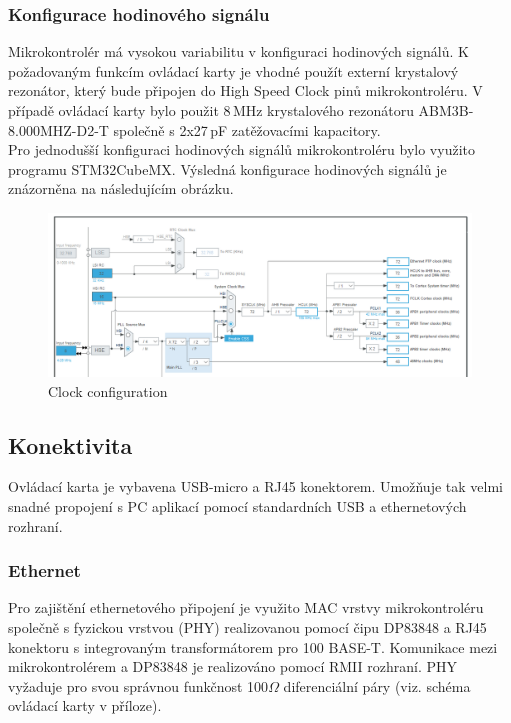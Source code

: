     \subsubsection{Konfigurace hodinového signálu}
    
    Mikrokontrolér má vysokou variabilitu v konfiguraci hodinových signálů.
    K požadovaným funkcím ovládací karty je vhodné použít externí krystalový rezonátor, který bude
    připojen do High Speed Clock pinů mikrokontroléru. V případě ovládací karty bylo použit 8\,MHz
    krystalového rezonátoru ABM3B-8.000MHZ-D2-T společně s 2x27\,pF zatěžovacími kapacitory.\\


    Pro jednodušší konfiguraci hodinových signálů mikrokontroléru bylo využito programu STM32CubeMX.
    Výsledná konfigurace hodinových signálů je znázorněna na následujícím obrázku.

    \begin{figure}[ht!]
        \centering
        \includegraphics[width = 1\textwidth]{obrazky/CLK_config.png}
        \caption{Clock configuration}
        \label{fig: Clock configuration}
    \end{figure}

    \subsection{Konektivita}
    Ovládací karta je vybavena USB-micro a RJ45 konektorem. Umožňuje tak velmi snadné propojení s PC aplikací
    pomocí standardních USB a ethernetových rozhraní.

    \subsubsection{Ethernet}
    Pro zajištění ethernetového připojení je využito MAC
    vrstvy mikrokontroléru společně s fyzickou vrstvou (PHY)
    realizovanou pomocí čipu DP83848 a RJ45 konektoru s integrovaným transformátorem pro 100 BASE-T. Komunikace mezi
    mikrokontrolérem a DP83848 je realizováno pomocí RMII rozhraní. PHY vyžaduje pro svou správnou funkčnost
    100$\Omega$ diferenciální páry (viz. schéma ovládací karty v příloze).\\
    
